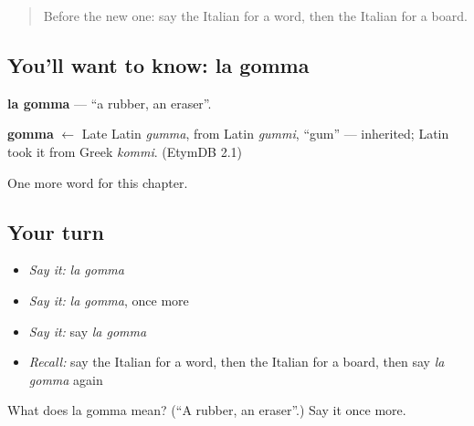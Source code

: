 \label{lesson:IT-C114-gomma}



\begin{quote}
Before the new one: say the Italian for a word, then the Italian for a board.
\end{quote}

\subsection*{You'll want to know: la gomma}
\textbf{la gomma} — \textquotedblleft{}a rubber, an eraser\textquotedblright{}.

\begin{cousinweb}
\textbf{gomma} $\leftarrow$ Late Latin \emph{gumma}, from Latin \emph{gummi}, \textquotedblleft{}gum\textquotedblright{} — inherited; Latin took it from Greek \emph{kommi}. (EtymDB 2.1)
\end{cousinweb}

\begin{grammarlens}[title={What you've built}]
One more word for this chapter.
\end{grammarlens}

\subsection*{Your turn}
\begin{itemize}
\raggedright
  \item \emph{Say it:} \emph{la gomma}
  \item \emph{Say it:} \emph{la gomma}, once more
  \item \emph{Say it:} say \emph{la gomma}
  \item \emph{Recall:} say the Italian for a word, then the Italian for a board, then say \emph{la gomma} again
\end{itemize}

\begin{tcolorbox}[breakable,colback=teal!4,colframe=teal!35!black,title={Before you move on}]
What does la gomma mean? (\textquotedblleft{}A rubber, an eraser\textquotedblright{}.) Say it once more.
\end{tcolorbox}
